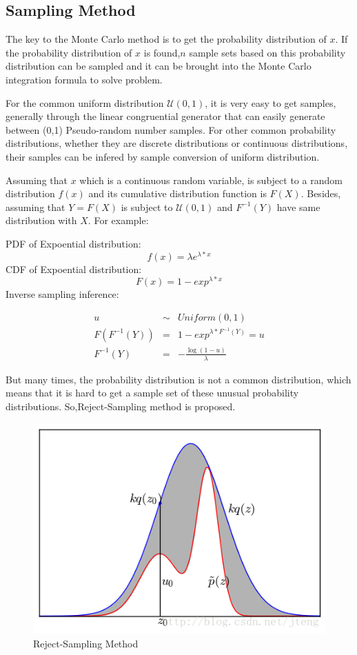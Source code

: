 \subsection{Sampling Method}
The key to the Monte Carlo method is to get the probability distribution of $x$. If the probability distribution of $x$ is found,$n$ sample sets based on this probability distribution can be sampled and it can be brought into the Monte Carlo integration formula to solve problem.

For the common uniform distribution $\mathcal U (0,1)$, it is very easy to get samples, generally through the linear congruential generator that can easily generate between (0,1) Pseudo-random number samples. For other common probability distributions, whether they are discrete distributions or continuous distributions, their samples can be infered by sample conversion of uniform distribution.

Assuming that $x$  which is a continuous random variable, is subject to a random distribution $f(x)$ and its cumulative distribution function is $F(X)$. Besides, assuming that $Y = F(X)$ is subject to $\mathcal U (0,1)$ and $F^{-1}(Y)$ have same distribution with $X$. For example:

PDF of Expoential distribution:
\[
  f(x) = \lambda e^{\lambda*x}
\]
CDF of Expoential distribution:
\[
  F(x) = 1- exp^{\lambda*x}
\]
Inverse sampling inference:

\begin{eqnarray*}
u & \sim & Uniform(0,1) \\
F(F^{-1}(Y)) &=& 1- exp^{\lambda*F^{-1}(Y)} = u \\
F^{-1}(Y) &=&-\frac{\log(1-u)}{\lambda}
\end{eqnarray*}

But many times, the probability distribution is not a common distribution, which means that it is hard to get a sample set of these unusual probability distributions. So,Reject-Sampling method is proposed.

\begin{figure}
  \includegraphics[width=\linewidth]{reject.png}
  \caption{Reject-Sampling Method}
  \label{fig:boat1}
\end{figure}

